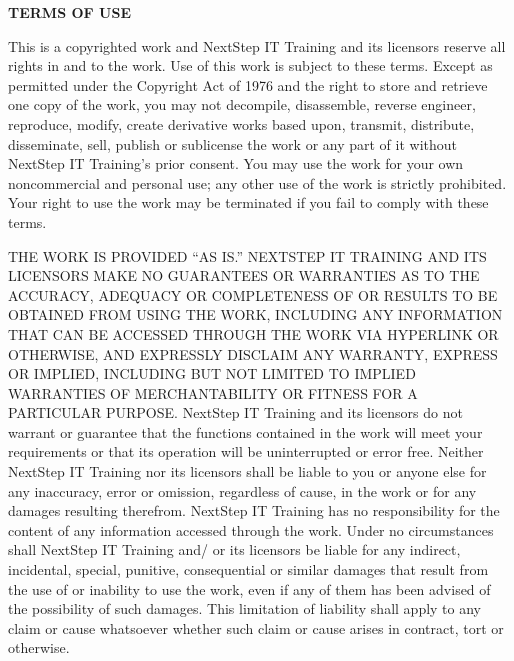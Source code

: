 \documentclass[../workbook]{subfiles}
\begin{document}
{    \par{
        \textbf{TERMS OF USE}
    }

    \par{
        This is a copyrighted work and NextStep IT Training and its licensors reserve all rights in and to the work.
        Use of this work is subject to these terms.
        Except as permitted under the Copyright Act of 1976 and the right to store and retrieve one copy of the work, you may not decompile, disassemble, reverse engineer, reproduce, modify, create derivative works based upon, transmit, distribute, disseminate, sell, publish or sublicense the work or any part of it without NextStep IT Training's prior consent.
        You may use the work for your own noncommercial and personal use; any other use of the work is strictly prohibited.
        Your right to use the work may be terminated if you fail to comply with these terms.
    }

    \par{
        THE WORK IS PROVIDED “AS IS.”
        NEXTSTEP IT TRAINING AND ITS LICENSORS MAKE NO GUARANTEES OR WARRANTIES AS TO THE ACCURACY, ADEQUACY OR COMPLETENESS OF OR RESULTS TO BE OBTAINED FROM USING THE WORK, INCLUDING ANY INFORMATION THAT CAN BE ACCESSED THROUGH THE WORK VIA HYPERLINK OR OTHERWISE, AND EXPRESSLY DISCLAIM ANY WARRANTY, EXPRESS OR IMPLIED, INCLUDING BUT NOT LIMITED TO IMPLIED WARRANTIES OF MERCHANTABILITY OR FITNESS FOR A PARTICULAR PURPOSE.
        NextStep IT Training and its licensors do not warrant or guarantee that the functions contained in the work will meet your requirements or that its operation will be uninterrupted or error free. Neither NextStep IT Training nor its licensors shall be liable to you or anyone else for any inaccuracy, error or omission, regardless of cause, in the work or for any damages resulting therefrom.
        NextStep IT Training has no responsibility for the content of any information accessed through the work. Under no circumstances shall NextStep IT Training and/ or its licensors be liable for any indirect, incidental, special, punitive, consequential or similar damages that result from the use of or inability to use the work, even if any of them has been advised of the possibility of such damages.
        This limitation of liability shall apply to any claim or cause whatsoever whether such claim or cause arises in contract, tort or otherwise.
    }
}

\end{document}
